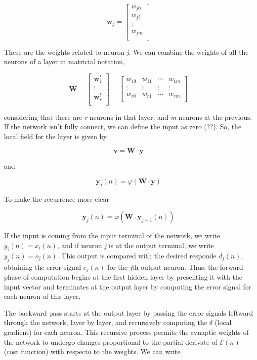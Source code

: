 \documentclass[twocolumn]{article}
\begin{document}
$$ \boldsymbol{w}_{j} = 
\begin{bmatrix}
	w_{j0} \\
	w_{ji} \\
	\vdots \\
	w_{jm} \\
\end{bmatrix}
$$

These are the weights related to neuron \textit{j}. We can combine the weights of all the neurons of a layer in matricial notation,

$$ \boldsymbol{W} =
\begin{bmatrix}
	\boldsymbol{w}_{1}^{t} \\
	\vdots \\
	\boldsymbol{w}_{r}^{t} \\
\end{bmatrix} =
\begin{bmatrix}
	w_{10} & w_{11} & \cdots & w_{1m} \\
	\vdots & \vdots & \vdots & \vdots \\
	w_{r0} & w_{r1} & \cdots & w_{rm} \\
\end{bmatrix}
$$

\noindent considering that there are \textit{r} neurons in that layer, and \textit{m} neurons at the previous. If the network isn't fully connect, we can define the input as zero (??). So, the local field for the layer is given by

$$ \boldsymbol{v} = \boldsymbol{W}\cdot\boldsymbol{y} $$

\noindent and

$$ \boldsymbol{y}_{j} (n) = \varphi (\boldsymbol{W}\cdot\boldsymbol{y}) $$

To make the recurrence more clear

$$ \boldsymbol{y}_{j} (n) = \varphi (\boldsymbol{W}  \cdot \boldsymbol{y}_{j - 1} (n)) $$

If the input is coming from the input terminal of the network, we write $ y_{i} (n) = x_{i} (n) $, and if neuron \textit{j} is at the output terminal, we write $ y_{j} (n) = o_{j} (n) $. This output is compared with the desired responde $ d_{j} (n) $, obtaining the error signal $ e_{j} (n) $ for the \textit{j}th output neuron. Thus, the forward phase of computation begins at the first hidden layer by presenting it with the input vector and terminates at the output layer by computing the error signal for each neuron of this layer.

The backward pass starts at the output layer by passing the error signals leftward through the network, layer by layer, and recursively computing the $ \delta $ (local gradient) for each neuron. This recursive process permits the synaptic weights of the network to undergo changes proportional to the partial derivate of $ \mathcal{E} (n) $ (cost function) with respecto to the weights. We can write
\end{document}
